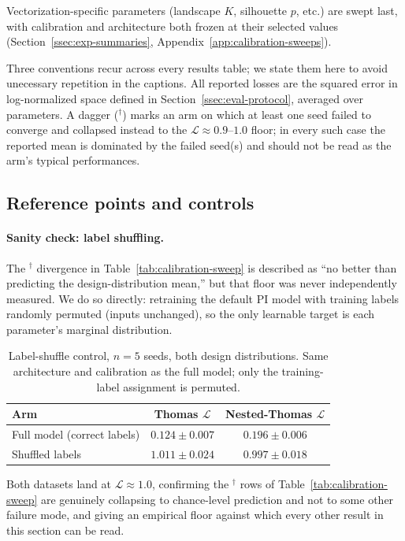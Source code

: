 \documentclass[11pt,letterpaper]{article}
\newcommand{\1}{\mathds{1}}
\theoremstyle{plain}
\theoremstyle{definitioncolon}
\begin{document}
Vectorization-specific parameters (landscape $K$,
silhouette $p$, etc.) are swept last, with calibration and architecture
both frozen at their selected values (Section~\ref{ssec:exp-summaries},
Appendix~\ref{app:calibration-sweeps}).

Three conventions recur across every results table; we state them here to avoid
unecessary repetition in the captions. All reported losses are the
squared error in log-normalized space defined in Section~\ref{ssec:eval-protocol},
averaged over parameters. A dagger ($^\dagger$) marks an arm on
which at least one seed failed to converge and collapsed instead to the
$\mathcal{L}\approx0.9$--$1.0$ floor; in every such case the reported
mean is dominated by the failed seed(s) and should not be read as the arm's
typical performances.

\subsection{Reference points and controls}
\label{ssec:exp-controls}

\paragraph{Sanity check: label shuffling.} The $^\dagger$ divergence in
Table~\ref{tab:calibration-sweep} is described as ``no better than predicting
the design-distribution mean,'' but that floor was never independently
measured. We do so directly: retraining the default PI model with training
labels randomly permuted (inputs unchanged), so the only learnable target is
each parameter's marginal distribution.
\begin{table}[tbp]
\centering
\small
\begin{tabular}{lcc}
\toprule
Arm & Thomas $\mathcal{L}$ & Nested-Thomas $\mathcal{L}$ \\
\midrule
Full model (correct labels) & $0.124 \pm 0.007$ & $0.196 \pm 0.006$ \\
Shuffled labels             & $1.011 \pm 0.024$ & $0.997 \pm 0.018$ \\
\bottomrule
\end{tabular}
\caption{Label-shuffle control, $n=5$ seeds, both design distributions. Same
architecture and calibration as the full model; only the training-label
assignment is permuted.}
\label{tab:label-shuffle}
\end{table}
Both datasets land at $\mathcal{L}\approx1.0$, confirming the $^\dagger$ rows
of Table~\ref{tab:calibration-sweep} are genuinely collapsing to
chance-level prediction and not to some other failure mode, and giving an
empirical floor against which every other result in this section can be
read.
\end{document}
